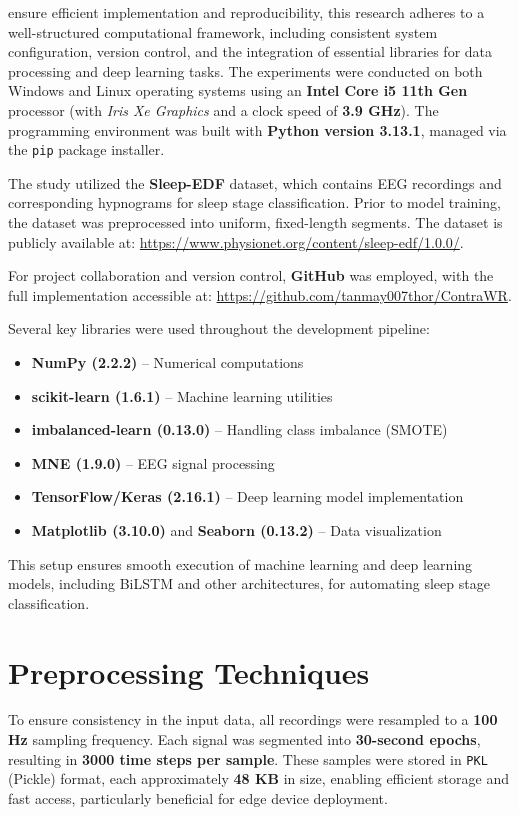  ensure efficient implementation and reproducibility, this research adheres to a well-structured computational framework, including consistent system configuration, version control, and the integration of essential libraries for data processing and deep learning tasks. The experiments were conducted on both Windows and Linux operating systems using an \textbf{Intel Core i5 11th Gen} processor (with \textit{Iris Xe Graphics} and a clock speed of \textbf{3.9 GHz}). The programming environment was built with \textbf{Python version 3.13.1}, managed via the \texttt{pip} package installer.

The study utilized the \textbf{Sleep-EDF} dataset, which contains EEG recordings and corresponding hypnograms for sleep stage classification. Prior to model training, the dataset was preprocessed into uniform, fixed-length segments. The dataset is publicly available at: \url{https://www.physionet.org/content/sleep-edf/1.0.0/}.

For project collaboration and version control, \textbf{GitHub} was employed, with the full implementation accessible at: \url{https://github.com/tanmay007thor/ContraWR}.

Several key libraries were used throughout the development pipeline:
\begin{itemize}
	\item \textbf{NumPy (2.2.2)} – Numerical computations
	\item \textbf{scikit-learn (1.6.1)} – Machine learning utilities
	\item \textbf{imbalanced-learn (0.13.0)} – Handling class imbalance (SMOTE)
	\item \textbf{MNE (1.9.0)} – EEG signal processing
	\item \textbf{TensorFlow/Keras (2.16.1)} – Deep learning model implementation
	\item \textbf{Matplotlib (3.10.0)} and \textbf{Seaborn (0.13.2)} – Data visualization
\end{itemize}

This setup ensures smooth execution of machine learning and deep learning models, including BiLSTM and other architectures, for automating sleep stage classification.



\section{Preprocessing Techniques}

To ensure consistency in the input data, all recordings were resampled to a \textbf{100 Hz} sampling frequency. Each signal was segmented into \textbf{30-second epochs}, resulting in \textbf{3000 time steps per sample}. These samples were stored in \texttt{PKL} (Pickle) format, each approximately \textbf{48 KB} in size, enabling efficient storage and fast access, particularly beneficial for edge device deployment.

